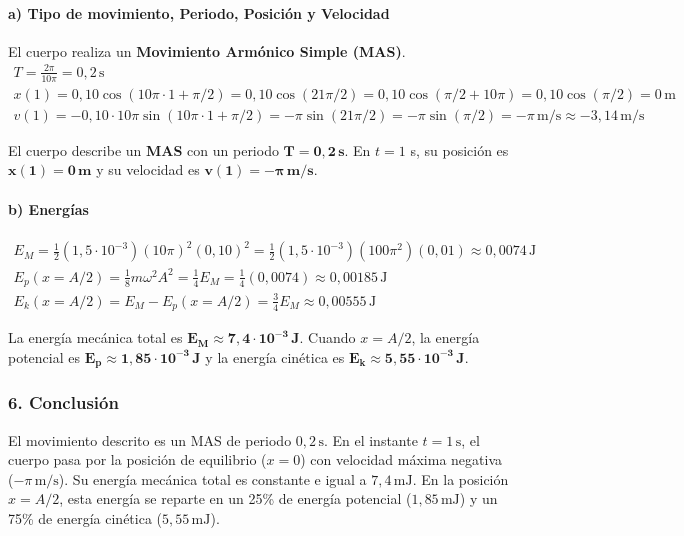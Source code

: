 \paragraph*{a) Tipo de movimiento, Periodo, Posición y Velocidad}
El cuerpo realiza un \textbf{Movimiento Armónico Simple (MAS)}.
\begin{gather}
    T = \frac{2\pi}{10\pi} = 0,2 \, \text{s} \\
    x(1) = 0,10 \cos(10\pi \cdot 1 + \pi/2) = 0,10 \cos(21\pi/2) = 0,10 \cos(\pi/2 + 10\pi) = 0,10 \cos(\pi/2) = 0 \, \text{m} \\
    v(1) = -0,10 \cdot 10\pi \sin(10\pi \cdot 1 + \pi/2) = -\pi \sin(21\pi/2) = -\pi \sin(\pi/2) = -\pi \, \text{m/s} \approx -3,14 \, \text{m/s}
\end{gather}
\begin{cajaresultado}
El cuerpo describe un \textbf{MAS} con un periodo $\boldsymbol{T=0,2 \, \textbf{s}}$. En $t=1$ s, su posición es $\boldsymbol{x(1)=0 \, \textbf{m}}$ y su velocidad es $\boldsymbol{v(1)=-\pi \, \textbf{m/s}}$.
\end{cajaresultado}

\paragraph*{b) Energías}
\begin{gather}
    E_M = \frac{1}{2}(1,5 \cdot 10^{-3})(10\pi)^2(0,10)^2 = \frac{1}{2}(1,5 \cdot 10^{-3})(100\pi^2)(0,01) \approx 0,0074 \, \text{J} \\
    E_p(x=A/2) = \frac{1}{8}m\omega^2A^2 = \frac{1}{4}E_M = \frac{1}{4}(0,0074) \approx 0,00185 \, \text{J} \\
    E_k(x=A/2) = E_M - E_p(x=A/2) = \frac{3}{4}E_M \approx 0,00555 \, \text{J}
\end{gather}
\begin{cajaresultado}
La energía mecánica total es $\boldsymbol{E_M \approx 7,4 \cdot 10^{-3} \, \textbf{J}}$. Cuando $x=A/2$, la energía potencial es $\boldsymbol{E_p \approx 1,85 \cdot 10^{-3} \, \textbf{J}}$ y la energía cinética es $\boldsymbol{E_k \approx 5,55 \cdot 10^{-3} \, \textbf{J}}$.
\end{cajaresultado}

\subsubsection*{6. Conclusión}
\begin{cajaconclusion}
El movimiento descrito es un MAS de periodo $0,2\,\text{s}$. En el instante $t=1\,\text{s}$, el cuerpo pasa por la posición de equilibrio ($x=0$) con velocidad máxima negativa ($-\pi\,\text{m/s}$). Su energía mecánica total es constante e igual a $7,4\,\text{mJ}$. En la posición $x=A/2$, esta energía se reparte en un 25\% de energía potencial ($1,85\,\text{mJ}$) y un 75\% de energía cinética ($5,55\,\text{mJ}$).
\end{cajaconclusion}
\newpage

